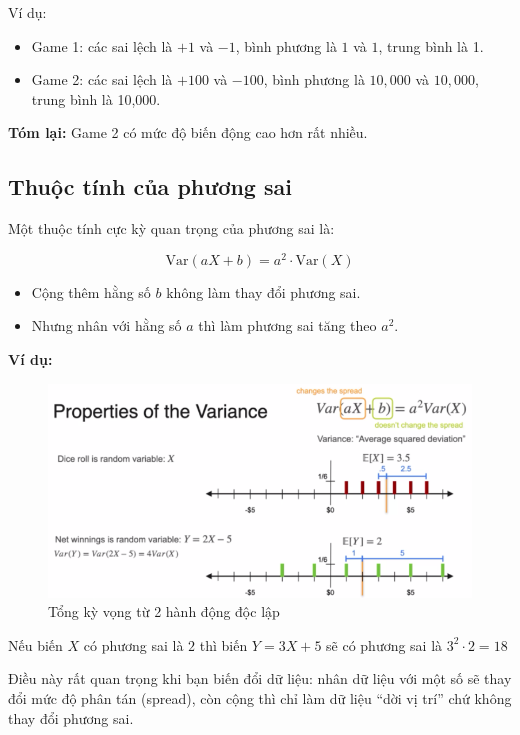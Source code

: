\documentclass[11pt]{article}
\begin{document}
Ví dụ:
\begin{itemize}
    \item Game 1: các sai lệch là $+1$ và $-1$, bình phương là $1$ và $1$, trung bình là 1.
    \item Game 2: các sai lệch là $+100$ và $-100$, bình phương là $10{,}000$ và $10{,}000$, trung bình là 10,000.
\end{itemize}

\textbf{Tóm lại:} Game 2 có mức độ biến động cao hơn rất nhiều.

\vspace{1em}

\subsection{Thuộc tính của phương sai}

Một thuộc tính cực kỳ quan trọng của phương sai là:

\[
\text{Var}(aX + b) = a^2 \cdot \text{Var}(X)
\]

\begin{itemize}
    \item Cộng thêm hằng số $b$ không làm thay đổi phương sai.
    \item Nhưng nhân với hằng số $a$ thì làm phương sai tăng theo $a^2$. 
\end{itemize}


\textbf{Ví dụ:}  
\begin{figure}[H]
    \centering
    \includegraphics[width=0.8\linewidth]{images/variance_property.png}
    \caption{Tổng kỳ vọng từ 2 hành động độc lập}
\end{figure}
Nếu biến $X$ có phương sai là $2$  
thì biến $Y = 3X + 5$ sẽ có phương sai là $3^2 \cdot 2 = 18$

Điều này rất quan trọng khi bạn biến đổi dữ liệu: nhân dữ liệu với một số sẽ thay đổi mức độ phân tán (spread), còn cộng thì chỉ làm dữ liệu “dời vị trí” chứ không thay đổi phương sai.
\end{document}
